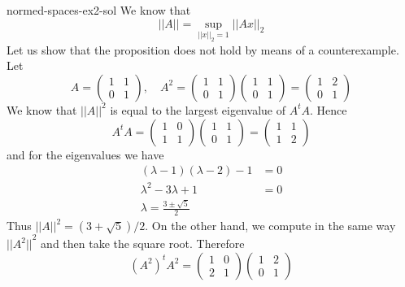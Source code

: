\documentclass[preview]{standalone}
\begin{document}
\begin{snippetsolution}{normed-spaces-ex2-sol}{}
    We know that
    \[
        ||A|| = \sup_{||x||_2 = 1} ||Ax||_2
    \]
    Let us show that the proposition does not hold by means of a counterexample.
    Let
    \[
        A = \begin{pmatrix}
            1 & 1 \\ 0 & 1
        \end{pmatrix}, \quad
        A^2 = \begin{pmatrix}
            1 & 1 \\ 0 & 1
        \end{pmatrix}
        \begin{pmatrix}
            1 & 1 \\ 0 & 1
        \end{pmatrix}
        = \begin{pmatrix}
            1 & 2 \\ 0 & 1
        \end{pmatrix}
    \]
    We know that \({||A||}^2\) is equal to the largest eigenvalue of \(A^t A\).
    Hence
    \[
        A^t A = \begin{pmatrix}
            1 & 0 \\ 1 & 1
        \end{pmatrix}
        \begin{pmatrix}
            1 & 1 \\ 0 & 1
        \end{pmatrix}
        = \begin{pmatrix}
            1 & 1 \\ 1 & 2
        \end{pmatrix}
    \]
    and for the eigenvalues we have \begin{align*}
        (\lambda -1)(\lambda - 2) - 1 &= 0\\
        \lambda^2 - 3\lambda + 1 &= 0 \\
        \lambda = \frac{3 \pm \sqrt{5}}{2}
    \end{align*}
    Thus \({||A||}^2 = (3 + \sqrt{5})/2\).
    On the other hand, we compute in the same way \({||A^2||}^2\) and then take the square root.
    Therefore
    \[
        (A^2)^t A^2 = \begin{pmatrix}
            1 & 0 \\ 2 & 1
        \end{pmatrix}
        \begin{pmatrix}
            1 & 2 \\ 0 & 1

\end{pmatrix}\]
\end{snippetsolution}
\end{document}
